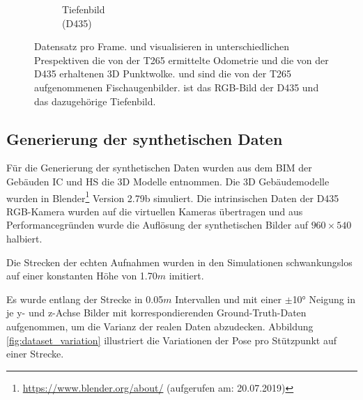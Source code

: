 \begin{figure}
\begin{subfigure}[t]{0.3\linewidth}
		\caption{Tiefenbild \\ (D435) \hspace*{2cm}}
		\label{subfig:depth-image}
	\end{subfigure}
	\caption{Datensatz pro Frame.   und  visualisieren in unterschiedlichen Prespektiven die von der T265 ermittelte Odometrie und die von der D435 erhaltenen 3D Punktwolke.  und  sind die von der T265 aufgenommenen Fischaugenbilder.  ist das RGB-Bild der D435 und  das dazugehörige Tiefenbild. }
	\label{fig:dataset}
\end{figure}

\subsection{Generierung der synthetischen Daten}
\label{subsec:generate_synth_images}
Für die Generierung der synthetischen Daten wurden aus dem BIM der Gebäuden IC und HS die 3D Modelle entnommen. Die 3D Gebäudemodelle wurden in Blender\footnote{\url{https://www.blender.org/about/} (aufgerufen am: 20.07.2019)} Version 2.79b simuliert. Die intrinsischen Daten der D435 RGB-Kamera wurden auf die virtuellen Kameras übertragen und aus Performancegründen wurde die Auflösung der synthetischen Bilder auf  $960\times540$ halbiert.

Die Strecken der echten Aufnahmen wurden in den Simulationen schwankungslos auf einer konstanten Höhe von 1.70$m$ imitiert.

Es wurde entlang der Strecke in 0.05$m$ Intervallen und mit einer $\pm$10° Neigung in je y- und z-Achse Bilder mit korrespondierenden Ground-Truth-Daten aufgenommen, um die Varianz der realen Daten abzudecken. Abbildung \ref{fig:dataset_variation} illustriert die Variationen der Pose pro Stützpunkt auf einer Strecke.


